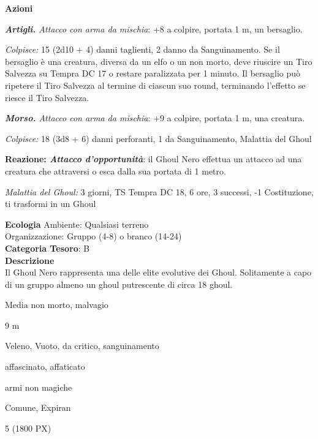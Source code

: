 \begin{multicols}{2}
{\textbf{Azioni}

\emph{\textbf{Artigli.} Attacco con arma da mischia}: +8 a colpire, portata 1 m, un bersaglio.

\emph{Colpisce:} 15 (2d10 + 4) danni taglienti, 2 danno da Sanguinamento. Se il bersaglio è una creatura, diversa da un elfo o un non morto, deve riuscire un Tiro Salvezza su Tempra DC 17 o restare paralizzata per 1 minuto. Il bersaglio può ripetere il Tiro Salvezza al termine di ciascun suo round, terminando l'effetto se riesce il Tiro Salvezza.

\emph{\textbf{Morso.} Attacco con arma da mischia}: +9 a colpire, portata 1 m, una creatura.

\emph{Colpisce:} 18 (3d8 + 6) danni perforanti, 1 da Sanguinamento, Malattia del Ghoul

\textbf{Reazione: \emph{Attacco d'opportunità}}: il Ghoul Nero effettua un attacco ad una creatura che attraversi o esca dalla sua portata di 1 metro.

\emph{Malattia del Ghoul:} 3 giorni, TS Tempra DC 18, 6 ore, 3 successi, -1 Costituzione, ti trasformi in un Ghoul

\textbf{Ecologia}
Ambiente: Qualsiasi terreno\\
Organizzazione: Gruppo (4-8) o branco (14-24)\\
\textbf{Categoria Tesoro}: B\\
\textbf{Descrizione}\\
Il Ghoul Nero rappresenta una delle elite evolutive dei Ghoul. Solitamente a capo di un gruppo almeno un ghoul putrescente di circa 18 ghoul.


\begin{description}[noitemsep, topsep=0pt, parsep=0pt, partopsep=0pt, itemsep=1pt, leftmargin=2.35cm,  labelwidth=2.2cm, itemindent=0cm, listparindent=0pt] %
\setlength{\baselineskip}{10pt}
\item[\textbf{Taglia/Tipo}] Media non morto, malvagio
\item[\textbf{Caratt.}] 
\item[\textbf{Punti Ferita}] 
\item[\textbf{Movimento}] 9 m
\item[\textbf{Tiri Salvez.}] 
\item[\textbf{Imm. Danni}] Veleno, Vuoto, da critico, sanguinamento
\item[\textbf{Immunità}] affascinato, affaticato
\item[\textbf{Res. Danni}] armi non magiche
\item[\textbf{Sensi}] 
\item[\textbf{Linguaggi}] Comune, Expiran
\item[\textbf{Sfida}] 5 (1800 PX)
\end{description}
\smallskip

}
\end{multicols}
